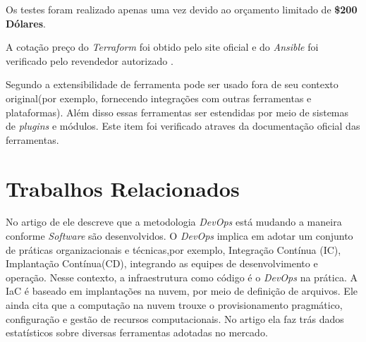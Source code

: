  Os testes foram realizado apenas uma vez devido ao orçamento limitado de \textbf{\$200 Dólares}.

A cotação preço do \textit{Terraform} foi obtido pelo site oficial e do \textit{Ansible} foi verificado pelo revendedor autorizado \cite{opensource.io}.

Segundo  a extensibilidade de ferramenta pode ser usado fora de seu contexto original(por exemplo, fornecendo integrações com outras ferramentas e plataformas). Além disso essas ferramentas ser estendidas por meio de sistemas de \textit{plugins} e módulos. Este item foi verificado atraves da documentação oficial das ferramentas.

\section{\esp Trabalhos Relacionados} \label{relacionados}

No artigo de \cite{Guerriero} ele descreve que a metodologia \textit{DevOps} está mudando a maneira conforme \textit{Software} são desenvolvidos. O \textit{DevOps} implica em adotar um conjunto de práticas organizacionais e técnicas,por exemplo, Integração Contínua (IC), Implantação Contínua(CD), integrando as equipes de desenvolvimento e operação. Nesse contexto, a infraestrutura como código é o \textit{DevOps} na prática. A IaC é baseado em implantações na nuvem, por meio de definição de arquivos. Ele ainda cita que a computação na nuvem trouxe o provisionamento pragmático, configuração e gestão de recursos computacionais. No artigo ela faz trás dados estatísticos sobre diversas ferramentas adotadas no mercado.


